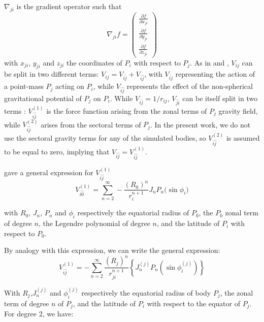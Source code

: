 \documentclass{aa}
\begin{document}
\begin{appendix}
$\nabla_{ji}$ is the gradient operator such that
\begin{equation}
\nabla_{ji}f
= \begin{pmatrix}
\displaystyle \frac{\partial f}{\partial x_{ji}} \\[6pt]
\displaystyle \frac{\partial f}{\partial y_{ji}} \\[6pt]
\displaystyle \frac{\partial f}{\partial z_{ji}}
\end{pmatrix}
\end{equation}
with $x_{ji}$, $y_{ji}$ and $z_{ji}$ the coordinates of $P_i$ with respect to $P_j$.
As in \cite{Lainey2004} and \cite{Dahoumane_2025}, $V_{ij}$ can be split in two different terms: $V_{ij}= V_{\bar{ij}} +V_{\bar{i} \hat{j}}$, with $V_{\bar{ij}}$ representing the action of a point-mass $P_j$ acting on $P_i$, while $V_{\bar{i} \hat{j}}$ represents the effect of the non-spherical gravitational potential of $P_j$ on $P_i$.
While $V_{\bar{ij}}= 1/r_{ij}$, $V_{\bar{j} \hat{i}}$ can be itself split in two terms \citep{Lainey2004,Dahoumane_2025}: $V^{(1)}_{\bar{i} \hat{j}}$ is the force function arising from the zonal terms of $P_j$ gravity field, while $V^{(2)}_{\bar{i} \hat{j}}$ arises from the sectoral terms of $P_j$. In the present work, we do not use the sectoral gravity terms for any of the simulated bodies, so $V^{(2)}_{\bar{i} \hat{j}}$ is assumed to be equal to zero, implying that $V_{\bar{i} \hat{j}} =V^{(1)}_{\bar{i} \hat{j}}$.

\cite{Lainey2004} gave a general expression for $V^{(1)}_{\bar{i} \hat{j}}$
\begin{equation}
    V^{(1)}_{\bar{i} \hat{0}} = \sum^\infty_{n=2}-\frac{(R_0)^n}{r_i^{n+1}}J_nP_n(\sin{\phi_i)}
\end{equation}

with $R_0$, $J_n$, $P_n$ and $\phi_i$ respectively the equatorial radius of $P_0$, the $P_0$ zonal term of degree $n$, the Legendre polynomial of degree $n$, and the latitude of $P_i$ with respect to $P_0$.

By analogy with this expression, we can write the general expression:
\begin{equation}
    V_{\bar{i} \hat{j}}^{(1)}  = -\sum_{n=2}^{\infty} \frac{\left(R_j\right)^n}{r_{ji}^{n+1}}\left\{J_n^{(j)} P_n\left(\sin \phi_i^{(j)}\right)\right\}
\end{equation}

With $R_j$,$J_n^{(j)}$ and $\phi_i^{(j)}$ respectively the equatorial radius of body $P_j$, the zonal term of degree $n$ of $P_j$, and the latitude of $P_i$ with respect to the equator of $P_j$. For degree 2, we have: 


\end{appendix}
\end{document}
